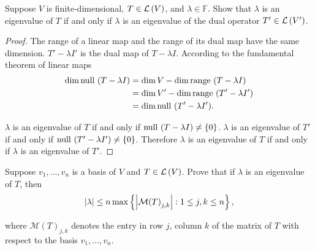 \begin{exercise}\label{chapter5:sectionA:exercise15}
    Suppose $V$ is finite-dimensional, $T\in\mathcal{L}\left({V}\right)$, and $\lambda\in\mathbb{F}$. Show that $\lambda$ is an eigenvalue of $T$ if and only if $\lambda$ is an eigenvalue of the dual operator $T'\in\mathcal{L}\left({V'}\right)$.
\end{exercise}

\begin{proof}
    The range of a linear map and the range of its dual map have the same dimension. $T' - \lambda I'$ is the dual map of $T - \lambda I$. According to the fundamental theorem of linear maps
    \begin{align*}
        \dim\operatorname{null}\,{(T - \lambda I)} & = \dim V - \dim\operatorname{range}\,{(T - \lambda I)}    \\
                                     & = \dim V' - \dim\operatorname{range}\,{(T' - \lambda I')} \\
                                     & = \dim\operatorname{null}\,{(T' - \lambda I')}.
    \end{align*}

    $\lambda$ is an eigenvalue of $T$ if and only if $\operatorname{null}\,{(T - \lambda I)}\ne \{0\}$. $\lambda$ is an eigenvalue of $T'$ if and only if $\operatorname{null}\,{(T' - \lambda I')}\ne \{0\}$. Therefore $\lambda$ is an eigenvalue of $T$ if and only if $\lambda$ is an eigenvalue of $T'$.
\end{proof}
\newpage

\begin{exercise}
    Suppose $v_{1}, \ldots, v_{n}$ is a basis of $V$ and $T\in\mathcal{L}\left({V}\right)$. Prove that if $\lambda$ is an eigenvalue of $T$, then
    \[
        \left\vert{\lambda}\right\vert\leq n\max\left\{ \left\vert{{\mathcal{M}(T)}_{j,k}}\right\vert: 1\leq j, k\leq n \right\},
    \]

    where ${\mathcal{M}(T)}_{j,k}$ denotes the entry in row $j$, column $k$ of the matrix of $T$ with respect to the basis $v_{1}, \ldots, v_{n}$.
\end{exercise}

